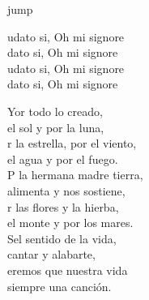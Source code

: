 \begin{cancion}[Laudato][]jump\\
	\begin{chorus}%
		udato si, Oh mi signore\\
		dato si, Oh mi signore\\
		udato si, Oh mi signore\\
		dato si, Oh mi signore\jump\\
	\end{chorus}%
	\jump
	Yor todo lo creado,\\
	 el sol y por la luna,\\
	r la estrella, por el viento,\\
	 el agua y por el fuego.\\
	\jump
	P la hermana madre tierra,\\
	 alimenta y nos sostiene,\\
	r las flores y la hierba,\\
	 el monte y por los mares.\\
	Sel sentido de la vida,\\
	cantar y alabarte,\\
	eremos que nuestra vida\\
	 siempre una canción.\\
	\jump
	\jump
	\jump
\end{cancion}%

